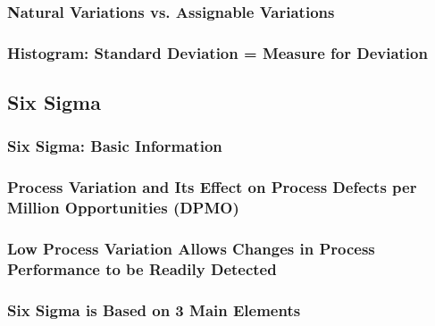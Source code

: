 \subsubsection{Natural Variations vs. Assignable Variations}
\subsubsection{Histogram: Standard Deviation = Measure for Deviation}
\subsection{Six Sigma}
\subsubsection{Six Sigma: Basic Information}
\subsubsection{Process Variation and Its Effect on Process Defects per Million Opportunities (DPMO)}
\subsubsection{Low Process Variation Allows Changes in Process Performance to be Readily Detected}
\subsubsection{Six Sigma is Based on 3 Main Elements}